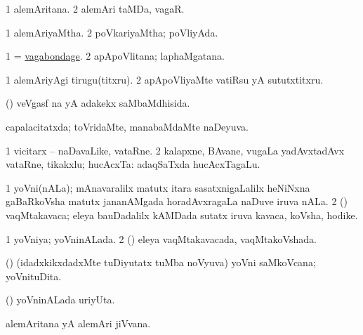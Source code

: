 \bentry
{} 
\gl{\nA}
\expl{}
\bmng
\bnum
\num{1} alemAritana. 
\num{2} alemAri taMDa, vagaR. 
\enum
\emng
\eentry

\bentry
{} 
\gl{\gu}
\expl{}
\bmng
\bnum
\num{1} alemAriyaMtha. 
\num{2} poVkariyaMtha; poVliyAda. 
\enum
\emng
\eentry

\bentry
{} 
\gl{\nA}
\expl{}
\bmng
\bnum
\num{1} = \hyperlink{vagabondage}{vagabondage}. 
\num{2} apApoVlitana; laphaMgatana. 
\enum
\emng
\eentry

\bentry
{} 
\gl{\akirx}
\expl{}
\bmng
\bnum
\num{1} alemAriyAgi tirugu(titxru). 
\num{2} apApoVliyaMte vatiRsu yA sututxtitxru. 
\enum
\emng
\eentry

\bentry
{} 
\gl{\gu}
\expl{}
\bmng
 (\aMrashA) veVgasf  na yA adakekx saMbaMdhisida. 
\emng
\eentry

\bentry
{} 
\gl{\gu}
\expl{}
\bmng
 capalacitatxda; toVridaMte, manabaMdaMte naDeyuva. 
\emng
\eentry

\bentry
{} 
\gl{\nA}
\bmng
\bnum
\num{1} vicitarx -- naDavaLike, vataRne. 
\num{2} kalapxne, BAvane, \mo vugaLa yadAvxtadAvx vataRne, tikakxlu; hucAcxTa:  adaqSaTxda hucAcxTagaLu. 
\enum
\emng
\eentry

\bentry
{} 
\gl{\nA}
\bmng
\bnum
\num{1} yoVni(nALa); mAnavaralilx matutx itara sasatxnigaLalilx heNiNxna gaBaRkoVsha matutx jananAMgada horadAvxragaLa naDuve iruva nALa. 
\num{2} (\savi) vaqMtakavaca; eleya bauDadalilx kAMDada sutatx iruva kavaca, koVsha, hodike. 
\enum
\emng
\eentry

\bentry
{} 
\gl{\gu}
\expl{}
\bmng
\bnum
\num{1} yoVniya; yoVninALada. 
\num{2} (\savi) eleya vaqMtakavacada, vaqMtakoVshada. 
\enum
\emng
\eentry

\bentry
{} 
\gl{\nA}
\expl{}
\bmng
 (\veYshA) (idadxkikxdadxMte tuDiyutatx tuMba noVyuva) yoVni saMkoVcana; yoVnituDita. 
\emng
\eentry

\bentry
{} 
\gl{\nA}
\expl{}
\bmng
 (\veYshA) yoVninALada uriyUta. 
\emng
\eentry

\bentry
{} 
\gl{\nA}
\expl{}
\bmng
 alemAritana yA alemAri jiVvana. 
\emng
\eentry

